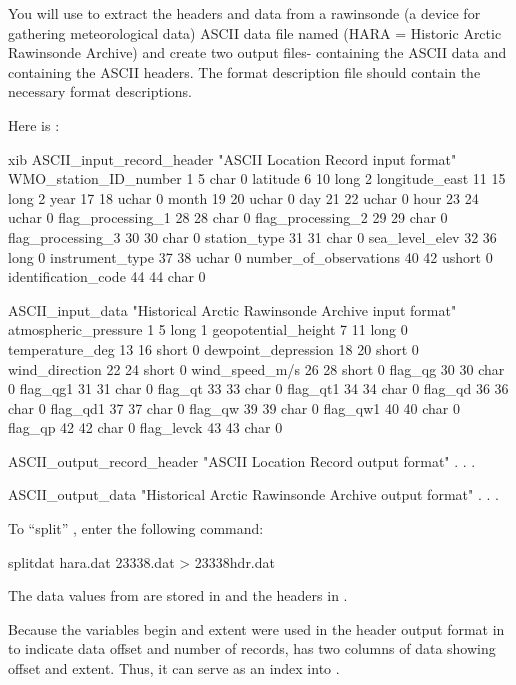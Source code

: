 You will use  to extract the headers and data from a
rawinsonde (a device for gathering meteorological data) ASCII data
file named  (HARA = Historic Arctic Rawinsonde Archive)
and create two output files- containing the ASCII data
and  containing the ASCII headers. The format
description file  should contain the necessary format
descriptions.

Here is :
\nopagebreak
\begin{vcode}{xib}
ASCII_input_record_header "ASCII Location Record input format"
WMO_station_ID_number 1 5 char 0
latitude 6 10 long 2
longitude_east 11 15 long 2
year 17 18 uchar 0
month 19 20 uchar 0
day 21 22 uchar 0
hour 23 24 uchar 0
flag_processing_1 28 28 char 0
flag_processing_2 29 29 char 0
flag_processing_3 30 30 char 0
station_type 31 31 char 0
sea_level_elev 32 36 long 0
instrument_type 37 38 uchar 0
number_of_observations 40 42 ushort 0
identification_code 44 44 char 0

ASCII_input_data "Historical Arctic Rawinsonde Archive input format"
atmospheric_pressure 1 5 long 1
geopotential_height 7 11 long 0
temperature_deg 13 16 short 0
dewpoint_depression 18 20 short 0
wind_direction 22 24 short 0
wind_speed_m/s 26 28 short 0
flag_qg 30 30 char 0
flag_qg1 31 31 char 0
flag_qt 33 33 char 0
flag_qt1 34 34 char 0
flag_qd 36 36 char 0
flag_qd1 37 37 char 0
flag_qw 39 39 char 0
flag_qw1 40 40 char 0
flag_qp 42 42 char 0
flag_levck 43 43 char 0

ASCII_output_record_header "ASCII Location Record output format"
       .
       .
       .

ASCII_output_data "Historical Arctic Rawinsonde Archive output format"
       .
       .
       .
\end{vcode}

To ``split'' , enter the following command: 

\begin{example}
splitdat hara.dat 23338.dat > 23338hdr.dat 
\end{example}

The data values from  are stored in  and
the headers in .

Because the variables begin and extent were used in the header output
format in  to indicate data offset and number of
records,  has two columns of data showing offset and
extent. Thus, it can serve as an index into .

